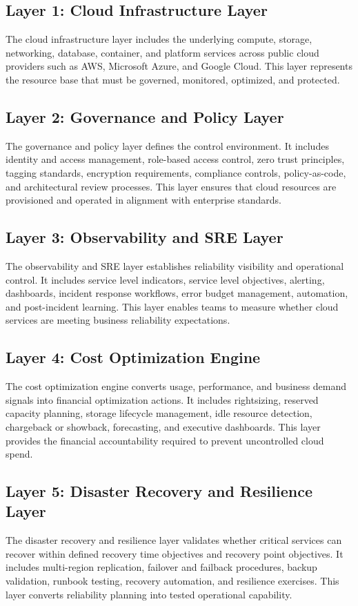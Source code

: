 \documentclass[conference]{IEEEtran}
\begin{document}
\subsection{Layer 1: Cloud Infrastructure Layer}
The cloud infrastructure layer includes the underlying compute, storage, networking, database, container, and platform services across public cloud providers such as AWS, Microsoft Azure, and Google Cloud. This layer represents the resource base that must be governed, monitored, optimized, and protected.

\subsection{Layer 2: Governance and Policy Layer}
The governance and policy layer defines the control environment. It includes identity and access management, role-based access control, zero trust principles, tagging standards, encryption requirements, compliance controls, policy-as-code, and architectural review processes. This layer ensures that cloud resources are provisioned and operated in alignment with enterprise standards.

\subsection{Layer 3: Observability and SRE Layer}
The observability and SRE layer establishes reliability visibility and operational control. It includes service level indicators, service level objectives, alerting, dashboards, incident response workflows, error budget management, automation, and post-incident learning. This layer enables teams to measure whether cloud services are meeting business reliability expectations.

\subsection{Layer 4: Cost Optimization Engine}
The cost optimization engine converts usage, performance, and business demand signals into financial optimization actions. It includes rightsizing, reserved capacity planning, storage lifecycle management, idle resource detection, chargeback or showback, forecasting, and executive dashboards. This layer provides the financial accountability required to prevent uncontrolled cloud spend.

\subsection{Layer 5: Disaster Recovery and Resilience Layer}
The disaster recovery and resilience layer validates whether critical services can recover within defined recovery time objectives and recovery point objectives. It includes multi-region replication, failover and failback procedures, backup validation, runbook testing, recovery automation, and resilience exercises. This layer converts reliability planning into tested operational capability.
\end{document}
